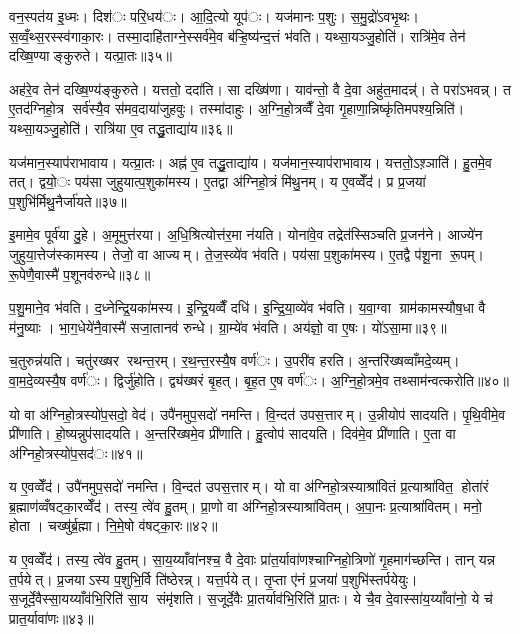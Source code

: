 वन॒स्पत॑य इ॒ध्मः। दिश॑ः परि॒धय॑ः। आ॒दि॒त्यो यूप॑ः। यज॑मानः प॒शुः। स॒मु॒द्रो॑ऽवभृ॒थः। स॒व्वँ॒थ्स॒रस्स्व॑गाका॒रः। तस्मा॒दाहि॑ताग्ने॒स्सर्व॑मे॒व ब॑ऱ्हि॒ष्य॑न्द॒त्तं भ॑वति। यथ्सा॒यञ्जु॒होति॑। रात्रि॑मे॒व तेन॑ दख्षि॒ण्याङ्कुरुते। यत्प्रा॒तः॥३५॥

अह॑रे॒व तेन॑ दख्षि॒ण्य॑ङ्कुरुते। यत्ततो॒ ददा॑ति। सा दख्षि॑णा। याव॑न्तो॒ वै दे॒वा अहु॑त॒मादन्न्॑। ते परा॑ऽभवन्न्। त ए॒तद॑ग्निहो॒त्र सर्व॑स्यै॒व स॑मव॒दाया॑जुहवुः। तस्मा॑दाहुः। अ॒ग्नि॒हो॒त्रव्वैँ दे॒वा गृ॒हाणा॒न्निष्कृ॑तिमपश्य॒न्निति॑। यथ्सा॒यञ्जु॒होति॑। रात्रि॑या ए॒व तद्धु॒ताद्या॑य॥३६॥

यज॑मान॒स्याप॑राभावाय। यत्प्रा॒तः। अह्न॑ ए॒व तद्धु॒ताद्या॑य। यज॑मान॒स्याप॑राभावाय। यत्ततो॒ऽश़्ञाति॑। हु॒तमे॒व तत्। द्वयो॒ः पय॑सा जुहुयात्प॒शुका॑मस्य। ए॒तद्वा अ॑ग्निहो॒त्रं मि॑थु॒नम्। य ए॒वव्वेँद॑। प्र प्र॒जया॑ प॒शुभि॑र्मिथु॒नैर्जा॑यते॥३७॥

इ॒मामे॒व पूर्व॑या दु॒हे। अ॒मूमुत्त॑रया। अ॒धि॒श्रित्योत्त॑र॒मा न॑यति। योना॑वे॒व तद्रेत॑स्सिञ्चति प्र॒जन॑ने। आज्ये॑न जुहुया॒त्तेज॑स्कामस्य। तेजो॒ वा आज्यम्। ते॒ज॒स्व्ये॑व भ॑वति। पय॑सा प॒शुका॑मस्य। ए॒तद्वै प॑शू॒ना रू॒पम्। रू॒पेणै॒वास्मै॑ प॒शूनव॑रुन्धे॥३८॥

प॒शु॒माने॒व भ॑वति। द॒ध्नेन्द्रि॒यका॑मस्य। इ॒न्द्रि॒यव्वैँ दधि॑। इ॒न्द्रि॒या॒व्ये॑व भ॑वति। य॒वा॒ग्वा ग्राम॑कामस्यौष॒धा वै म॑नु॒ष्याः। भा॒ग॒धेये॑नै॒वास्मै॑ सजा॒तानव॑ रुन्धे। ग्रा॒म्ये॑व भ॑वति। अय॑ज्ञो॒ वा ए॒षः। यो॑ऽसा॒मा॥३९॥

च॒तुरुन्न॑यति। चतु॑रख्षर रथन्त॒रम्। र॒थ॒न्त॒रस्यै॒ष वर्ण॑ः। उ॒परी॑व हरति। अ॒न्तरि॑ख्षव्वाँमदे॒व्यम्। वा॒म॒दे॒व्यस्यै॒ष वर्ण॑ः। द्विर्जु॑होति। द्व्य॑ख्षरं बृ॒हत्। बृ॒ह॒त ए॒ष वर्ण॑ः। अ॒ग्नि॒हो॒त्रमे॒व तथ्साम॑न्वत्करोति॥४०॥

यो वा अ॑ग्निहो॒त्रस्यो॑प॒सदो॒ वेद॑। उपै॑नमुप॒सदो॑ नमन्ति। वि॒न्दत॑ उपस॒त्तारम्। उ॒न्नीयोप॑ सादयति। पृ॒थि॒वीमे॒व प्री॑णाति। हो॒ष्यन्नुप॑सादयति। अ॒न्तरि॑ख्षमे॒व प्री॑णाति। हु॒त्वोप॑ सादयति। दिव॑मे॒व प्री॑णाति। ए॒ता वा अ॑ग्निहो॒त्रस्यो॑प॒सद॑ः॥४१॥

य ए॒वव्वेँद॑। उपै॑नमुप॒सदो॑ नमन्ति। वि॒न्दत॑ उपस॒त्तारम्। यो वा अ॑ग्निहो॒त्रस्याश्रा॑वितं प्र॒त्याश्रा॑वित॒ होता॑रं ब्र॒ह्माण॑व्वँषट्का॒रव्वेँद॑। तस्य॒ त्वे॑व हु॒तम्। प्रा॒णो वा अ॑ग्निहो॒त्रस्याश्रा॑वितम्। अ॒पा॒नः प्र॒त्याश्रा॑वितम्। मनो॒ होता। चख्षु॑र्ब्र॒ह्मा। नि॒मे॒षो व॑षट्का॒रः॥४२॥

य ए॒वव्वेँद॑। तस्य॒ त्वे॑व हु॒तम्। सा॒य॒य्याँवा॑नश्च॒ वै दे॒वाः प्रा॑त॒र्यावा॑णश्चाग्निहो॒त्रिणो॑ गृ॒हमाग॑च्छन्ति। तान् यन्न त॒र्पयेत्। प्र॒जयाऽस्य प॒शुभि॒र्वि ति॑ष्ठेरन्न्। यत्त॒र्पयेत्। तृ॒प्ता ए॑नं प्र॒जया॑ प॒शुभि॑स्तर्पयेयुः। स॒जूर्दे॒वैस्सा॒यय्याँव॑भि॒रिति॑ सा॒य संमृ॑शति। स॒जूर्दे॒वैः प्रा॒तर्याव॑भि॒रिति॑ प्रा॒तः। ये चै॒व दे॒वास्सा॑य॒य्याँवा॑नो॒ ये च॑ प्रात॒र्यावा॑णः॥४३॥

